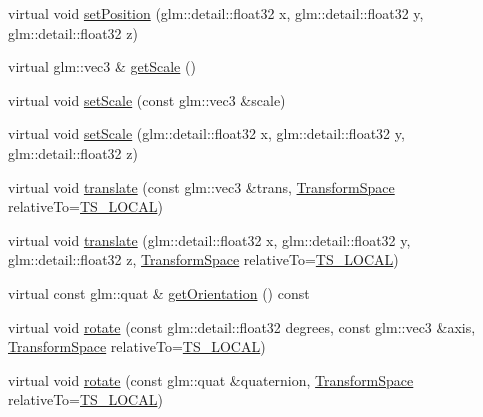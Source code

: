 \begin{DoxyCompactItemize}
\item 
virtual void \hyperlink{classglr_1_1BasicSceneNode_a2f1217111e8ce40c37c6404b5e9ff9ac}{set\-Position} (glm\-::detail\-::float32 x, glm\-::detail\-::float32 y, glm\-::detail\-::float32 z)
\item 
virtual glm\-::vec3 \& \hyperlink{classglr_1_1BasicSceneNode_afb0cb5d2273408277154c400dee9bafa}{get\-Scale} ()
\item 
virtual void \hyperlink{classglr_1_1BasicSceneNode_a85332188c5aac6ba149a9d19d57b4698}{set\-Scale} (const glm\-::vec3 \&scale)
\item 
virtual void \hyperlink{classglr_1_1BasicSceneNode_abcefe0919b3b95f43326c7e6b1397154}{set\-Scale} (glm\-::detail\-::float32 x, glm\-::detail\-::float32 y, glm\-::detail\-::float32 z)
\item 
virtual void \hyperlink{classglr_1_1BasicSceneNode_a89d36e8080ff28ff75e19d1ad872f4a1}{translate} (const glm\-::vec3 \&trans, \hyperlink{classglr_1_1ISceneNode_a851f520b81216ff73085a9ee79e2c52a}{Transform\-Space} relative\-To=\hyperlink{classglr_1_1ISceneNode_a851f520b81216ff73085a9ee79e2c52aaca47a4d27c5f296f990e9d426beba45d}{T\-S\-\_\-\-L\-O\-C\-A\-L})
\item 
virtual void \hyperlink{classglr_1_1BasicSceneNode_a974b85c31b87e3848aa5b62920993880}{translate} (glm\-::detail\-::float32 x, glm\-::detail\-::float32 y, glm\-::detail\-::float32 z, \hyperlink{classglr_1_1ISceneNode_a851f520b81216ff73085a9ee79e2c52a}{Transform\-Space} relative\-To=\hyperlink{classglr_1_1ISceneNode_a851f520b81216ff73085a9ee79e2c52aaca47a4d27c5f296f990e9d426beba45d}{T\-S\-\_\-\-L\-O\-C\-A\-L})
\item 
virtual const glm\-::quat \& \hyperlink{classglr_1_1BasicSceneNode_a90fa449be21838bc339e758c63abbd00}{get\-Orientation} () const 
\item 
virtual void \hyperlink{classglr_1_1BasicSceneNode_a28f8894b96db8245a971fe96664e9d07}{rotate} (const glm\-::detail\-::float32 degrees, const glm\-::vec3 \&axis, \hyperlink{classglr_1_1ISceneNode_a851f520b81216ff73085a9ee79e2c52a}{Transform\-Space} relative\-To=\hyperlink{classglr_1_1ISceneNode_a851f520b81216ff73085a9ee79e2c52aaca47a4d27c5f296f990e9d426beba45d}{T\-S\-\_\-\-L\-O\-C\-A\-L})
\item 
virtual void \hyperlink{classglr_1_1BasicSceneNode_a1bf63e0dca92e2581ce876c35f2e4f0b}{rotate} (const glm\-::quat \&quaternion, \hyperlink{classglr_1_1ISceneNode_a851f520b81216ff73085a9ee79e2c52a}{Transform\-Space} relative\-To=\hyperlink{classglr_1_1ISceneNode_a851f520b81216ff73085a9ee79e2c52aaca47a4d27c5f296f990e9d426beba45d}{T\-S\-\_\-\-L\-O\-C\-A\-L})

\end{DoxyCompactItemize}
